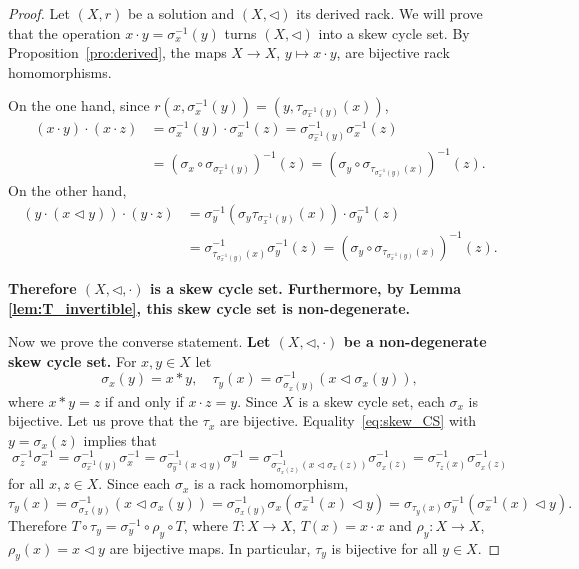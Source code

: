 \begin{proof}
Let $(X,r)$ be a solution and $(X,\triangleleft)$ its derived rack. We will prove that 
the operation $x\cdot y=\sigma_x^{-1}(y)$ turns $(X,\triangleleft)$ into a skew cycle set.
By Proposition~\ref{pro:derived}, 
the 
maps $X\to X$, $y\mapsto x\cdot y$, are bijective rack homomorphisms. 

On the one hand, since $r(x,\sigma_x^{-1}(y))=(y,\tau_{\sigma_x^{-1}(y)}(x))$, 
\begin{align*}
(x\cdot y)\cdot (x\cdot z)
&=\sigma_x^{-1}(y)\cdot\sigma_x^{-1}(z)
=\sigma_{\sigma_x^{-1}(y)}^{-1}\sigma_x^{-1}(z)\\
&=\left(\sigma_x\circ\sigma_{\sigma_x^{-1}(y)}\right)^{-1}(z)
=\left(\sigma_y\circ\sigma_{\tau_{\sigma_x^{-1}(y)}(x)}\right)^{-1}(z).
\end{align*}
On the other hand, 
\begin{align*}
(y\cdot (x\triangleleft y))\cdot (y\cdot z)
&=\sigma_y^{-1}(\sigma_y\tau_{\sigma_x^{-1}(y)}(x))\cdot\sigma_y^{-1}(z)\\
&=\sigma^{-1}_{\tau_{\sigma_x^{-1}(y)}(x)}\sigma_y^{-1}(z)
=\left(\sigma_y\circ\sigma_{\tau_{\sigma^{-1}_x(y)}(x)}\right)^{-1}(z).
\end{align*}

{\bf Therefore $(X,\triangleleft ,\cdot)$ is a skew cycle set. Furthermore, by Lemma \ref{lem:T_invertible}, this skew cycle set is non-degenerate.}

Now we prove the converse statement. {\bf Let $(X,\triangleleft,\cdot)$ be a non-degenerate skew cycle set.} 
For $x,y\in X$ let 
\[
\sigma_x(y)=x*y,
\quad
\tau_y(x)=\sigma_{\sigma_x(y)}^{-1}(x\triangleleft\sigma_x(y)), 
\]
where $x*y=z$ if and only if $x\cdot z=y$. 
Since $X$ is a skew cycle set, each $\sigma_x$ is bijective. Let us prove that the $\tau_x$ are bijective. 
Equality~\eqref{eq:skew_CS} with $y=\sigma_x(z)$ implies that
\begin{equation}\label{eq:solskew}
\sigma_z^{-1}\sigma_x^{-1}=\sigma^{-1}_{\sigma_x^{-1}(y)}\sigma_x^{-1}
=\sigma^{-1}_{\sigma_y^{-1}(x\triangleleft y)}\sigma_y^{-1}
=\sigma^{-1}_{\sigma^{-1}_{\sigma_x(z)}(x\triangleleft\sigma_x(z))}\sigma^{-1}_{\sigma_x(z)}
=\sigma^{-1}_{\tau_z(x)}\sigma^{-1}_{\sigma_x(z)}
\end{equation}
for all $x,z\in X$. 
Since each $\sigma_x$ is a rack homomorphism, 
\[
\tau_y(x)=\sigma^{-1}_{\sigma_x(y)}(x\triangleleft\sigma_x(y))
=\sigma^{-1}_{\sigma_x(y)}\sigma_x(\sigma^{-1}_x(x)\triangleleft y)
=\sigma_{\tau_y(x)}\sigma_y^{-1}(\sigma_x^{-1}(x)\triangleleft y).
\]
Therefore $T\circ\tau_y=\sigma_y^{-1}\circ\rho_y\circ T$, where $T\colon X\to X$, $T(x)=x\cdot x$ 
and $\rho_y\colon X\to X$, $\rho_y(x)=x\triangleleft y$ are bijective maps. In particular, 
$\tau_y$ is bijective for all $y\in X$. 


\end{proof}
